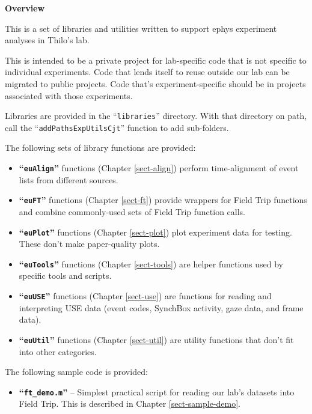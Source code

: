 
\iffalse
%
\chapter{Overview}
%
\else
%
\vspace*{0.75in}
{\Huge \bfseries Overview}
\vspace*{\baselineskip}
\label{sect-over}
%
\fi

This is a set of libraries and utilities written to support ephys experiment
analyses in Thilo's lab.

This is intended to be a private project for lab-specific code that is not
specific to individual experiments. Code that lends itself to reuse outside
our lab can be migrated to public projects. Code that's experiment-specific
should be in projects associated with those experiments.

Libraries are provided in the ``\texttt{libraries}'' directory. With that
directory on path, call the \linebreak ``\texttt{addPathsExpUtilsCjt}''
function to add sub-folders.

The following sets of library functions are provided:
\begin{itemize}
%
\item \textbf{``\texttt{euAlign}''} functions (Chapter \ref{sect-align})
perform time-alignment of event lists from different sources.
%
\item \textbf{``\texttt{euFT}''} functions (Chapter \ref{sect-ft})
provide wrappers for Field Trip functions and combine commonly-used sets
of Field Trip function calls.
%
\item \textbf{``\texttt{euPlot}''} functions (Chapter \ref{sect-plot})
plot experiment data for testing. These don't make paper-quality plots.
%
\item \textbf{``\texttt{euTools}''} functions (Chapter \ref{sect-tools})
are helper functions used by specific tools and scripts.
%
\item \textbf{``\texttt{euUSE}''} functions (Chapter \ref{sect-use})
are functions for reading and interpreting USE data (event codes, SynchBox
activity, gaze data, and frame data).
%
\item \textbf{``\texttt{euUtil}''} functions (Chapter \ref{sect-util})
are utility functions that don't fit into other categories.
%
\end{itemize}

The following sample code is provided:
\begin{itemize}
%
\item \textbf{``\texttt{ft\_demo.m}''} -- Simplest practical script for
reading our lab's datasets into Field Trip. This is described in Chapter
\ref{sect-sample-demo}.
%
\end{itemize}

%
